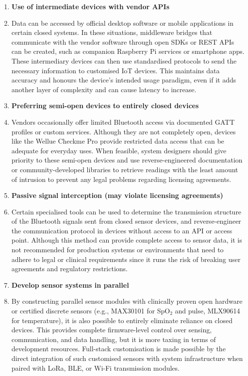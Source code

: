 \begin{enumerate}
	\item \textbf{Use of intermediate devices with vendor APIs}
	\item[] Data can be accessed by official desktop software or mobile applications in certain closed systems. In these situations, middleware bridges that communicate with the vendor software through open SDKs or REST APIs can be created, such as companion Raspberry Pi services or smartphone apps. These intermediary devices can then use standardised protocols to send the necessary information to customised IoT devices. This maintains data accuracy and honours the device's intended usage paradigm, even if it adds another layer of complexity and can cause latency to increase.
	\item \textbf{Preferring semi-open devices to entirely closed devices}
	\item[] Vendors occasionally offer limited Bluetooth access via documented GATT profiles or custom services. Although they are not completely open, devices like the Wellue Checkme Pro provide restricted data access that can be adequate for everyday uses. When feasible, system designers should give priority to these semi-open devices and use reverse-engineered documentation or community-developed libraries to retrieve readings with the least amount of intrusion to prevent any legal problems regarding licensing agreements.
	\item \textbf{Passive signal interception (may violate licensing agreements)}
	\item[] Certain specialised tools can be used to determine the transmission structure of the Bluetooth signals sent from closed sensor devices, and reverse-engineer the communication protocol in devices without access to an API or access point. Although this method can provide complete access to sensor data, it is not recommended for production systems or environments that need to adhere to legal or clinical requirements since it runs the risk of breaking user agreements and regulatory restrictions.
	\item \textbf{Develop sensor systems in parallel}
	\item[] By constructing parallel sensor modules with clinically proven open hardware or certified discrete sensors (e.g., MAX30101 for SpO$_2$ and pulse, MLX90614 for temperature), it is also possible to entirely eliminate reliance on closed devices. This provides complete firmware-level control over sensing, communication, and data handling, but it is more taxing in terms of development resources. Full-stack customisation is made possible by the direct integration of such customised sensors with system infrastructure when paired with LoRa, BLE, or Wi-Fi transmission modules.

\end{enumerate}
